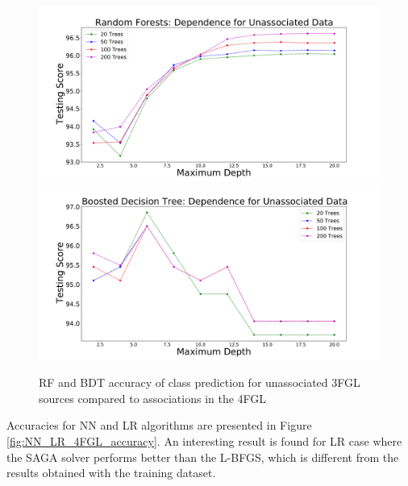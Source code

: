 \begin{figure}[h]
\includegraphics[width=\twopicsp\textwidth]{plots/unassoc2.pdf}
\includegraphics[width=\twopicsp\textwidth]{plots/unassoc_complex.pdf}
\caption{RF and BDT accuracy of class prediction for unassociated 3FGL sources compared to associations in the 4FGL}
\label{fig:RF_BDT_4FGL_accuracy}
\end{figure}

Accuracies for NN and LR algorithms are presented in Figure \ref{fig:NN_LR_4FGL_accuracy}.
An interesting result is found for LR case where the SAGA solver performs better than the L-BFGS, which is different from the results obtained with the training dataset. 

